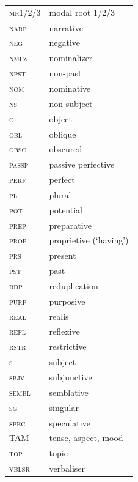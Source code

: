 \documentclass[output=paper,colorlinks,citecolor=brown]{langscibook}
\begin{document}
\begin{tabularx}{.5\textwidth}{@{}lQ@{}}
\textsc{mr1/2/3} & modal root 1/2/3 \\
\textsc{narr} & narrative\\
\textsc{neg} & negative \\
\textsc{nmlz} & nominalizer \\
\textsc{npst} & non-past \\
\textsc{nom} & nominative \\
\textsc{ns} & non-subject \\
\textsc{o} & object \\
\textsc{obl} & oblique \\
\textsc{obsc} & obscured \\
\textsc{passp} & passive perfective \\
\textsc{perf} & perfect \\
\textsc{pl} & plural\\
\textsc{pot} & potential\\
\textsc{prep} & preparative \\
\textsc{prop} & proprietive (`having') \\
\textsc{prs} & present \\
\textsc{pst} & past \\
\textsc{rdp} & reduplication \\
\textsc{purp} & purposive \\
\textsc{real} & realis \\
\textsc{refl} & reflexive\\
\textsc{rstr} & restrictive \\ 
\textsc{s} & subject\\
\textsc{sbjv} & subjunctive \\
\textsc{sembl} & semblative \\
\textsc{sg} & singular \\
\textsc{spec} & speculative \\
TAM & tense, aspect, mood\\
\textsc{top} & topic \\
\textsc{vblsr} & verbaliser
\end{tabularx}


\printbibliography[heading=subbibliography,notkeyword=this]
\end{document}
